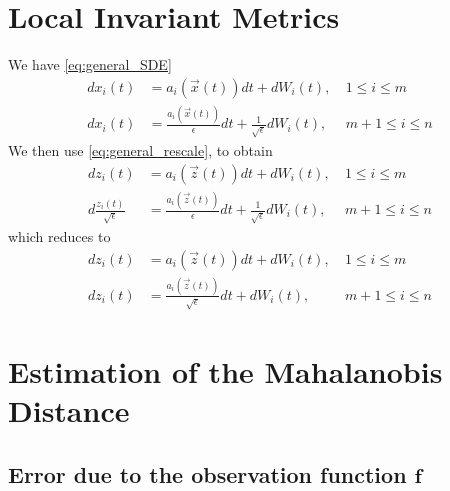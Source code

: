 \documentclass[12pt]{article}
\begin{document}
\section{Local Invariant Metrics}

We have \eqref{eq:general_SDE}
\begin{equation}
\begin{aligned}
dx_i(t) &= a_i(\vec{x}(t)) dt + dW_i(t), & \: 1 \le i \le m \\
dx_i(t) &= \frac{a_i(\vec{x}(t))}{\epsilon} dt + \frac{1}{\sqrt{\epsilon}} dW_i(t) , & \: m+1 \le i \le n
\end{aligned}
\end{equation}
%
We then use \eqref{eq:general_rescale}, to obtain
%
\begin{equation}
\begin{aligned}
d z_i(t) &= a_i(\vec{z}(t)) dt + dW_i(t), & \: 1 \le i \le m \\
d \frac{z_i(t)}{\sqrt{\epsilon}} &= \frac{a_i(\vec{z}(t))}{\epsilon} dt + \frac{1}{\sqrt{\epsilon}} dW_i(t) , & \: m+1 \le i \le n
\end{aligned}
\end{equation}
%
which reduces to
%
\begin{equation}
\begin{aligned}
d z_i(t) &= a_i(\vec{z}(t)) dt + dW_i(t), & \: 1 \le i \le m \\
d z_i(t) &= \frac{a_i(\vec{z}(t))}{\sqrt{\epsilon}} dt + dW_i(t) , & \: m+1 \le i \le n
\end{aligned}
\end{equation}

\section{Estimation of the Mahalanobis Distance}

\subsection{Error due to the observation function $\mathbf{f}$}
\end{document}
